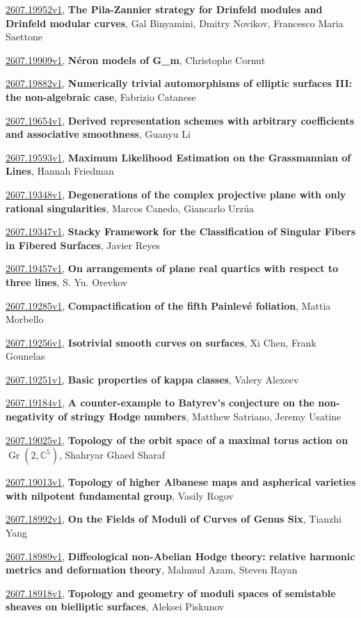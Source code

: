\documentclass[9pt, a4paper]{article}
\theoremstyle{plain}
\theoremstyle{definition}
\theoremstyle{remark}
\newcommand{\arxiv}[3]{\href{https://arxiv.org/abs/#1}{#1}, \textbf{\textcolor{arxivblue}{#2}}, #3}
\begin{document}
\arxiv{2607.19952v1}{The Pila-Zannier strategy for Drinfeld modules and Drinfeld modular curves}{Gal Binyamini, Dmitry Novikov, Francesco Maria Saettone}

\arxiv{2607.19909v1}{N{é}ron models of G\_m}{Christophe Cornut}

\arxiv{2607.19882v1}{Numerically trivial automorphisms of elliptic surfaces III: the non-algebraic case}{Fabrizio Catanese}

\arxiv{2607.19654v1}{Derived representation schemes with arbitrary coefficients and associative smoothness}{Guanyu Li}

\arxiv{2607.19593v1}{Maximum Likelihood Estimation on the Grassmannian of Lines}{Hannah Friedman}

\arxiv{2607.19348v1}{Degenerations of the complex projective plane with only rational singularities}{Marcos Canedo, Giancarlo Urzúa}

\arxiv{2607.19347v1}{Stacky Framework for the Classification of Singular Fibers in Fibered Surfaces}{Javier Reyes}

\arxiv{2607.19457v1}{On arrangements of plane real quartics with respect to three lines}{S. Yu. Orevkov}

\arxiv{2607.19285v1}{Compactification of the fifth Painlevé foliation}{Mattia Morbello}

\arxiv{2607.19256v1}{Isotrivial smooth curves on surfaces}{Xi Chen, Frank Gounelas}

\arxiv{2607.19251v1}{Basic properties of kappa classes}{Valery Alexeev}

\arxiv{2607.19184v1}{A counter-example to Batyrev's conjecture on the non-negativity of stringy Hodge numbers}{Matthew Satriano, Jeremy Usatine}

\arxiv{2607.19025v1}{Topology of the orbit space of a maximal torus action on $\operatorname{Gr}(2,\mathbb{C}^{5})$}{Shahryar Ghaed Sharaf}

\arxiv{2607.19013v1}{Topology of higher Albanese maps and aspherical varieties with nilpotent fundamental group}{Vasily Rogov}

\arxiv{2607.18992v1}{On the Fields of Moduli of Curves of Genus Six}{Tianzhi Yang}

\arxiv{2607.18989v1}{Diffeological non-Abelian Hodge theory: relative harmonic metrics and deformation theory}{Mahmud Azam, Steven Rayan}

\arxiv{2607.18918v1}{Topology and geometry of moduli spaces of semistable sheaves on bielliptic surfaces}{Aleksei Piskunov}
\end{document}
